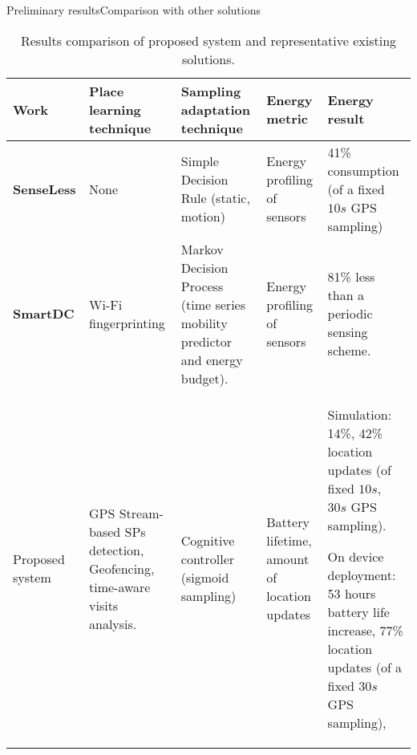 \begin{frame}[noframenumbering]{Preliminary results}{Comparison with other solutions}
\begin{table}[]
\centering
\small
\tabcolsep=0.12cm
\renewcommand{\arraystretch}{1.2}
\begin{tabular}{@{}p{1cm}p{2cm}p{2.5cm}p{2cm}p{3cm}@{}}
\toprule
\textbf{Work} &
\textbf{Place learning technique} &
\textbf{Sampling adaptation technique} &
\textbf{Energy metric} &
\textbf{Energy result} \\ 
\midrule

\textbf{SenseLess} &
None &
Simple Decision Rule (static, motion) &
Energy profiling of sensors &
41\% consumption (of a fixed $10 s$ GPS sampling) \\

\cmidrule[0.25pt]{1-5}
\textbf{SmartDC} &
Wi-Fi fingerprinting &
Markov Decision Process (time series mobility predictor and energy budget). &
Energy profiling of sensors &
81\% less than a periodic sensing scheme.\\

\cmidrule[0.25pt]{1-5}
Proposed system &
GPS Stream-based SPs detection, Geofencing, time-aware visits analysis. &
Cognitive controller (sigmoid sampling) &
Battery lifetime, amount of location updates &
{
Simulation: 14\%, 42\% location updates (of fixed $10 s$, $30 s$ GPS sampling).

On device deployment: 53 hours battery life increase, 77\% location updates (of a fixed $30 s$ GPS sampling), 
}\\

\bottomrule
\end{tabular}%

\caption{Results comparison of proposed system and representative existing solutions.}
\end{table}
\end{frame}




